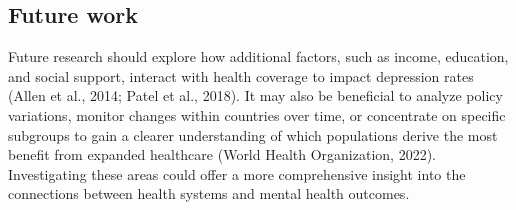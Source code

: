 \subsection{Future work}

Future research should explore how additional factors, such as income, education, and social support, interact with health coverage to impact depression rates (Allen et al., 2014; Patel et al., 2018). It may also be beneficial to analyze policy variations, monitor changes within countries over time, or concentrate on specific subgroups to gain a clearer understanding of which populations derive the most benefit from expanded healthcare (World Health Organization, 2022). Investigating these areas could offer a more comprehensive insight into the connections between health systems and mental health outcomes.
